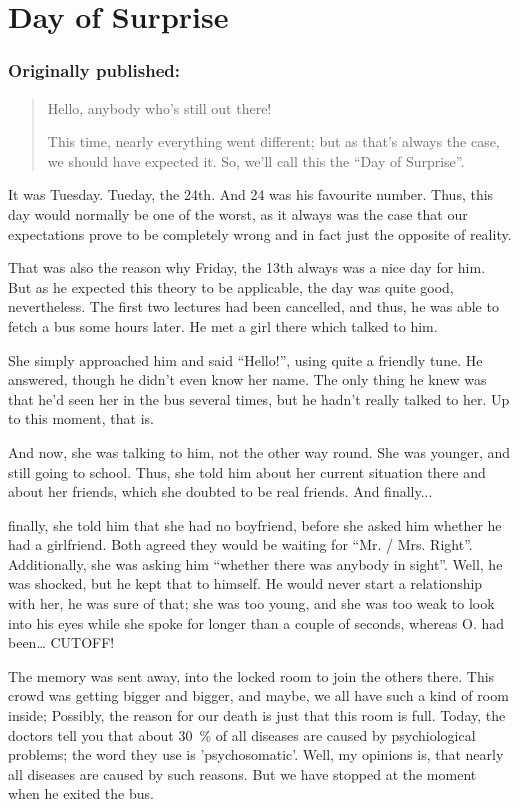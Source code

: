 \chapter{Day of Surprise}
\label{cha:day-surprise}
\subsection*{Originally published: }
\begin{quote}
Hello, anybody who's still out there!

This time, nearly everything went different; but as that's always the case, we should have expected it. So, we'll call this the \enquote{Day of Surprise}. 
\end{quote}

It was Tuesday. Tueday, the 24th. And 24 was his favourite number. Thus, this day would normally be one of the worst, as it always was the case that our expectations prove to be completely wrong and in fact just the opposite of reality.

That was also the reason why Friday, the 13th always was a nice day for him. 
But as he expected this theory to be applicable, the day was quite good, nevertheless. 
The first two lectures had been cancelled, and thus, he was able to fetch a bus some hours later. 
He met a girl there which talked to him.

She simply approached him and said \enquote{Hello!}, using quite a friendly tune. 
He answered, though he didn't even know her name. The only thing he knew was that he'd seen her in the bus several times, but he hadn't really talked to her. 
Up to this moment, that is.

And now, she was talking to him, not the other way round. 
She was younger, and still going to school. Thus, she told him about her current situation there and about her friends, which she doubted to be real friends. 
And finally...

finally, she told him that she had no boyfriend, before she asked him whether he had a girlfriend. 
Both agreed they would be waiting for \enquote{Mr. / Mrs. Right}. Additionally, she was asking him \enquote{whether there was anybody in sight}. 
Well, he was shocked, but he kept that to himself. 
He would never start a relationship with her, he was sure of that; she was too young, and she was too weak to look into his eyes while she spoke for longer than a couple of seconds, whereas O. had been\dots{} CUTOFF!

The memory was sent away, into the locked room to join the others there. 
This crowd was getting bigger and bigger, and maybe, we all have such a kind of room inside; Possibly, the reason for our death is just that this room is full. 
Today, the doctors tell you that about \SI{30}{\percent} of all diseases are caused by psychiological problems; the word they use is 'psychosomatic'. 
Well, my opinions is, that nearly all diseases are caused by such reasons. 
But we have stopped at the moment when he exited the bus.

